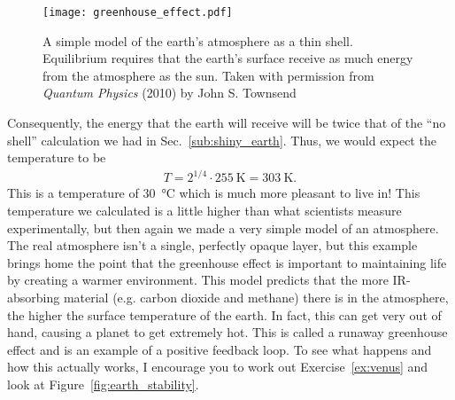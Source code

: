     \begin{figure}[ht]
        \centering 
        \texttt{[image: greenhouse\_effect.pdf]}
        \caption{A simple model of the earth's atmosphere as a thin shell. Equilibrium requires that the earth's surface receive as much energy from the atmosphere as the sun. Taken with permission from \emph{Quantum Physics} (2010) by John S. Townsend \citep{townsend2010baby}} 
        \label{fig:greenhouse_effect}
    \end{figure}

    Consequently, the energy that the earth will receive will be twice that of the ``no shell'' calculation we had in Sec.~\ref{sub:shiny_earth}. Thus, we would expect the temperature to be 
    \begin{align}
        T = 2^{1/4} \cdot \SI{255}{\kelvin} = \SI{303}{\kelvin}.
    \end{align}
    This is a temperature of \SI{30}{\celsius} which is much more pleasant to live in! This temperature we calculated is a little higher than what scientists measure experimentally, but then again we made a very simple model of an atmosphere. The real atmosphere isn't a single, perfectly opaque layer, but this example brings home the point that the greenhouse effect is important to maintaining life by creating a warmer environment. This model predicts that the more IR-absorbing material (e.g. carbon dioxide and methane) there is in the atmosphere, the higher the surface temperature of the earth. In fact, this can get very out of hand, causing a planet to get extremely hot. This is called a runaway greenhouse effect and is an example of a positive feedback loop. To see what happens and how this actually works, I encourage you to work out Exercise~\ref{ex:venus} and look at Figure~\ref{fig:earth_stability}.


